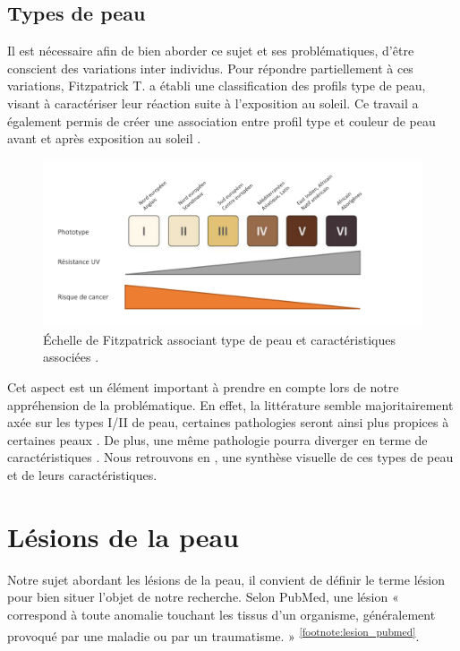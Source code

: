 \subsection{Types de peau}
Il est nécessaire afin de bien aborder ce sujet et ses problématiques, d’être conscient des variations inter individus. Pour répondre partiellement à ces variations, Fitzpatrick T. a établi une classification des profils type de peau, visant à caractériser leur réaction suite à l’exposition au soleil. Ce travail a également permis de créer une association entre profil type et couleur de peau avant et après exposition au soleil \cite{Fitzpatrick1988}. 
\begin{figure}[H]
    \centering
    \includegraphics[width=\linewidth]{contents/chapter_1/resources/Fitzpatrick.pdf}
    \caption{Échelle de Fitzpatrick associant type de peau et caractéristiques associées \cite{Fitzpatrick1988}.}
    \label{fig:fitzpatrick}
\end{figure}
Cet aspect est un élément important à prendre en compte lors de notre appréhension de la problématique. En effet, la littérature semble majoritairement axée sur les types I/II de peau, certaines pathologies seront ainsi plus propices à certaines peaux \cite{Narayanan2010}. De plus, une même pathologie pourra diverger en terme de caractéristiques \cite{Tuma2015}. Nous retrouvons en , une synthèse visuelle de ces types de peau et de leurs caractéristiques.

\section{Lésions de la peau}
Notre sujet abordant les lésions de la peau, il convient de définir le terme lésion pour bien situer l’objet de notre recherche. Selon PubMed, une lésion « correspond à toute anomalie touchant les tissus d’un organisme, généralement provoqué par une maladie ou par un traumatisme. » \textsuperscript{\ref{footnote:lesion_pubmed}}.\par
\addtocounter{footnote}{1}

